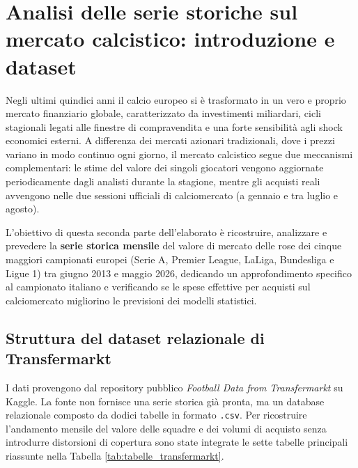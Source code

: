 \section{Analisi delle serie storiche sul mercato calcistico: introduzione e dataset}
\label{sec:p2_etl}

Negli ultimi quindici anni il calcio europeo si è trasformato in un vero e proprio mercato finanziario globale, caratterizzato da investimenti miliardari, cicli stagionali legati alle finestre di compravendita e una forte sensibilità agli shock economici esterni. A differenza dei mercati azionari tradizionali, dove i prezzi variano in modo continuo ogni giorno, il mercato calcistico segue due meccanismi complementari: le stime del valore dei singoli giocatori vengono aggiornate periodicamente dagli analisti durante la stagione, mentre gli acquisti reali avvengono nelle due sessioni ufficiali di calciomercato (a gennaio e tra luglio e agosto).

L'obiettivo di questa seconda parte dell'elaborato è ricostruire, analizzare e prevedere la \textbf{serie storica mensile} del valore di mercato delle rose dei cinque maggiori campionati europei (Serie A, Premier League, LaLiga, Bundesliga e Ligue 1) tra giugno 2013 e maggio 2026, dedicando un approfondimento specifico al campionato italiano e verificando se le spese effettive per acquisti sul calciomercato migliorino le previsioni dei modelli statistici.

\subsection{Struttura del dataset relazionale di Transfermarkt}

I dati provengono dal repository pubblico \textit{Football Data from Transfermarkt} su Kaggle. La fonte non fornisce una serie storica già pronta, ma un database relazionale composto da dodici tabelle in formato \texttt{.csv}. Per ricostruire l'andamento mensile del valore delle squadre e dei volumi di acquisto senza introdurre distorsioni di copertura sono state integrate le sette tabelle principali riassunte nella Tabella \ref{tab:tabelle_transfermarkt}.

